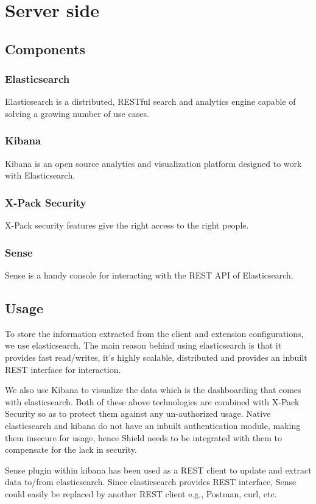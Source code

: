 \chapter{Server side}
\section{Components}

\subsection{Elasticsearch} 
Elasticsearch is a distributed, RESTful search and analytics engine capable of solving a growing number of use cases.

\subsection{Kibana} 
Kibana is an open source analytics and visualization platform designed to work with Elasticsearch.

\subsection{X-Pack Security} 
X-Pack security features give the right access to the right people.

\subsection{Sense} 
Sense is a handy console for interacting with the REST API of Elasticsearch.

\section{Usage}
To store the information extracted from the client and extension configurations, we use elasticsearch. The main reason behind using elasticsearch is that it provides fast read/writes, it’s highly scalable, distributed and provides an inbuilt REST interface for interaction. 


We also use Kibana to visualize the data which is the dashboarding that comes with elasticsearch. Both of these above technologies are combined with X-Pack Security so as to protect them against any un-authorized usage. Native elasticsearch and kibana do not have an inbuilt authentication module, making them insecure for usage, hence Shield needs to be integrated with them to compensate for the lack in security. 

Sense plugin within kibana has been used as a REST client to update and extract data to/from  elasticsearch. Since elasticsearch provides REST interface, Sense could easily be replaced by another REST client e.g., Postman, curl, etc. 